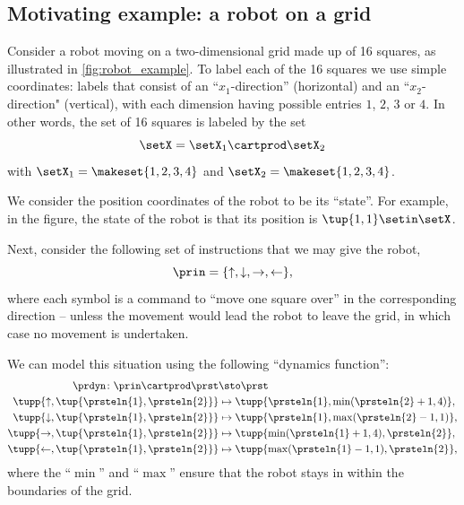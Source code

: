    
\subsection{Motivating example: a robot on a grid}
\label{sec:robot-motivating-example}
   
    Consider a robot moving on a two-dimensional grid made up of 16 squares, as illustrated in \cref{fig:robot_example}. To label each of the 16 squares we use simple coordinates: labels that consist of an ``$x_1$-direction'' (horizontal) and an ``$x_2$-direction" (vertical), with each dimension having possible entries $1$, $2$, $3$ or $4$. In other words, the set of 16 squares is labeled by the set
\begin{equation}
    \setX = \setX_1 \cartprod \setX_2
\end{equation}
with $\setX_1 = \makeset{1, 2, 3, 4}$ and $\setX_2 = \makeset{1, 2, 3, 4}$. 

    \begin{marginfigure}
        \centering
        \caption{Robot on a grid example. }
        \label{fig:robot_example}
    \end{marginfigure}

    We consider the position coordinates of the robot to be its ``state''.  For example, in the figure, the state of the robot is that its position is $\tup{1,1} \setin \setX$. 
    
    
    Next, consider the following set of instructions that we may give the robot,
\begin{equation}
\prin=\{\uparrow, \downarrow,\rightarrow,\leftarrow\},
\end{equation}
where each symbol is a command to ``move one square over'' in the corresponding direction  -- unless the movement would lead the robot to leave the grid, in which case no movement is undertaken. 


We can model this situation using the following  ``dynamics function'': 
    \begin{equation}
        \begin{aligned}
            \prdyn\colon \prin \cartprod \prst                & \sto \prst \\
            \tupp{\uparrow, \tup{\prsteln{1},\prsteln{2}}}    & \mapsto \tupp{\prsteln{1}, \min(\prsteln{2}+1,4)}, \\
            \tupp{\downarrow, \tup{\prsteln{1},\prsteln{2}}}  & \mapsto \tupp{\prsteln{1}, \max(\prsteln{2}-1,1)}, \\
            \tupp{\rightarrow, \tup{\prsteln{1},\prsteln{2}}} & \mapsto \tupp{\min(\prsteln{1}+1,4), \prsteln{2}}, \\
            \tupp{\leftarrow, \tup{\prsteln{1},\prsteln{2}}}  & \mapsto \tupp{\max(\prsteln{1}-1,1), \prsteln{2}}, \\
        \end{aligned}
    \end{equation}
    where the ``$\min$'' and ``$\max$'' ensure that the robot stays in within the boundaries of the grid.
    
